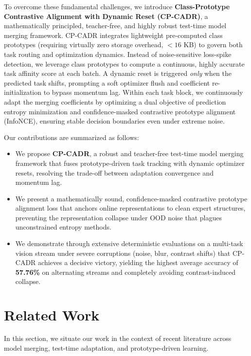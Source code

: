 \documentclass{article}
\theoremstyle{plain}
\theoremstyle{definition}
\theoremstyle{remark}
\begin{document}
To overcome these fundamental challenges, we introduce \textbf{Class-Prototype Contrastive Alignment with Dynamic Reset (CP-CADR)}, a mathematically principled, teacher-free, and highly robust test-time model merging framework. CP-CADR integrates lightweight pre-computed class prototypes (requiring virtually zero storage overhead, $<16$ KB) to govern both task routing and optimization dynamics. Instead of noise-sensitive loss-spike detection, we leverage class prototypes to compute a continuous, highly accurate task affinity score at each batch. A dynamic reset is triggered \emph{only} when the predicted task shifts, prompting a soft optimizer flush and coefficient re-initialization to bypass momentum lag. Within each task block, we continuously adapt the merging coefficients by optimizing a dual objective of prediction entropy minimization and confidence-masked contrastive prototype alignment (InfoNCE), ensuring stable decision boundaries even under extreme noise.

Our contributions are summarized as follows:
\begin{itemize}
    \item We propose \textbf{CP-CADR}, a robust and teacher-free test-time model merging framework that fuses prototype-driven task tracking with dynamic optimizer resets, resolving the trade-off between adaptation convergence and momentum lag.
    \item We present a mathematically sound, confidence-masked contrastive prototype alignment loss that anchors online representations to clean expert structures, preventing the representation collapse under OOD noise that plagues unconstrained entropy methods.
    \item We demonstrate through extensive deterministic evaluations on a multi-task vision stream under severe corruptions (noise, blur, contrast shifts) that CP-CADR achieves a decisive victory, yielding the highest average accuracy of \textbf{57.76\%} on alternating streams and completely avoiding contrast-induced collapse.
\end{itemize}

\section{Related Work}
\label{sec:related}
In this section, we situate our work in the context of recent literature across model merging, test-time adaptation, and prototype-driven learning.
\end{document}
